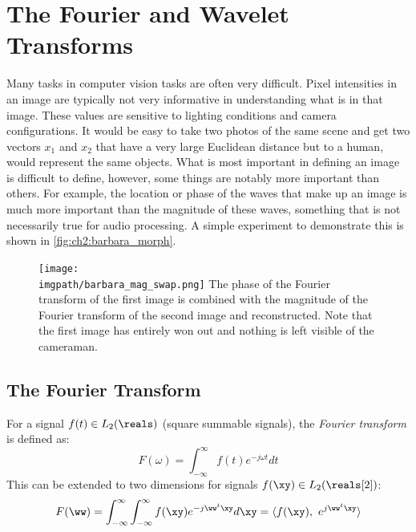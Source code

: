 \section{The Fourier and Wavelet Transforms}\label{sec:ch2:fourier}

  Many tasks in computer vision tasks are often very difficult. Pixel intensities in an image are
  typically not very informative in understanding what is in that image.
  These values are sensitive to lighting conditions and camera configurations.
  It would be easy to take two photos of the same scene and get two vectors
  $x_1$ and $x_2$ that have a very large Euclidean distance but to a human,
  would represent the same objects. What is most important in defining an image is
  difficult to define, however, some things are notably more important than
  others. For example, the location or phase of the waves that make up an
  image is much more important than the magnitude of these waves, something
  that is not necessarily true for audio processing. A simple experiment to
  demonstrate this is shown in \autoref{fig:ch2:barbara_morph}.
  \begin{figure}
    \centering
      \texttt{[image: \\imgpath/barbara\_mag\_swap.png]}
        {The phase of the Fourier transform of the first image is combined with
        the magnitude of the Fourier transform of the second image and
        reconstructed. Note that the first image has entirely won out and
        nothing is left visible of the cameraman.}
      \label{fig:ch2:barbara_morph}
  \end{figure}

\subsection{The Fourier Transform}
For a signal $f(t) \in L_2(\reals)$ (square summable signals), the \emph{Fourier
transform} is defined as:
\begin{equation}
  F(\omega) = \int_{-\infty}^{\infty} f(t) e^{-j\omega t} dt
\end{equation}
This can be extended to two dimensions for signals $f(\xy) \in L_2(\reals[2])$:
\begin{equation}
  F(\ww) = \int_{-\infty}^{\infty}\int_{-\infty}^{\infty} f(\xy) e^{-j\ww^t \xy} d\xy = \langle f(\xy),\ e^{j\ww^t \xy} \rangle
\end{equation}

